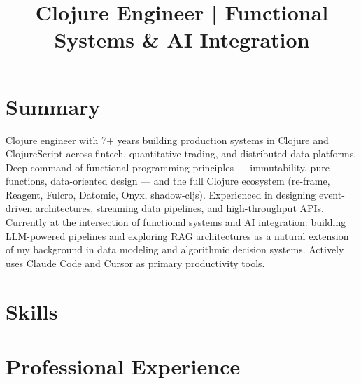 \documentclass[10pt,a4paper,sans]{moderncv}
\title{Clojure Engineer | Functional Systems \& AI Integration}
\begin{document}
\makecvtitle

\section{Summary}
Clojure engineer with 7+ years building production systems in Clojure and ClojureScript across fintech, quantitative trading, and distributed data platforms. Deep command of functional programming principles — immutability, pure functions, data-oriented design — and the full Clojure ecosystem (re-frame, Reagent, Fulcro, Datomic, Onyx, shadow-cljs). Experienced in designing event-driven architectures, streaming data pipelines, and high-throughput APIs. Currently at the intersection of functional systems and AI integration: building LLM-powered pipelines and exploring RAG architectures as a natural extension of my background in data modeling and algorithmic decision systems. Actively uses Claude Code and Cursor as primary productivity tools.

\section{Skills}

\section{Professional Experience}
\end{document}
